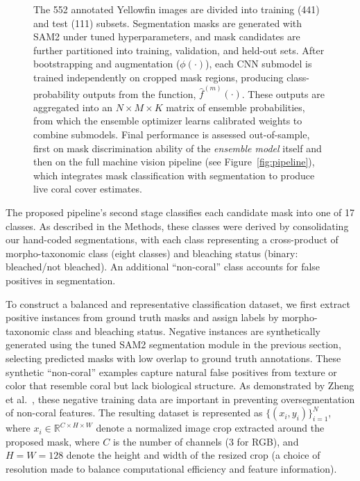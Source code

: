 \documentclass[11pt]{elsarticle}
\begin{document}
\begin{figure}
    \centering
    \resizebox{0.9\textheight}{!}{%
        
    }
    \caption{The 552 annotated Yellowfin images are divided into training (441) and test (111) subsets. Segmentation masks are generated with SAM2 under tuned hyperparameters, and mask candidates are further partitioned into training, validation, and held-out sets. After bootstrapping and augmentation ($\phi(\cdot)$), each CNN submodel is trained independently on cropped mask regions, producing class-probability outputs from the function, $\hat{f}^{(m)}(\cdot)$. These outputs are aggregated into an $N \times M \times K$ matrix of ensemble probabilities, from which the ensemble optimizer learns calibrated weights to combine submodels. Final performance is assessed out-of-sample, first on mask discrimination ability of the \emph{ensemble model} itself and then on the full machine vision pipeline (see Figure~\ref{fig:pipeline}), which integrates mask classification with segmentation to produce live coral cover estimates.}
    \label{fig:training_pipeline}
\end{figure}

The proposed pipeline's second stage classifies each candidate mask into one of 17 classes. As described in the Methods, these classes were derived by consolidating our hand-coded segmentations, with each class representing a cross-product of morpho-taxonomic class (eight classes) and bleaching status (binary: bleached/not bleached). An additional ``non-coral'' class accounts for false positives in segmentation.

To construct a balanced and representative classification dataset, we first extract positive instances from ground truth masks and assign labels by morpho-taxonomic class and bleaching status. Negative instances are synthetically generated using the tuned SAM2 segmentation module in the previous section, selecting predicted masks with low overlap to ground truth annotations. These synthetic ``non-coral'' examples capture natural false positives from texture or color that resemble coral but lack biological structure. As demonstrated by Zheng et al.\ \citep{zheng2024}, these negative training data are important in preventing oversegmentation of non-coral features. The resulting dataset is represented as $\{(x_i, y_i)\}_{i=1}^N$, where $x_i \in \mathbb{R}^{C \times H \times W}$ denote a normalized image crop extracted around the proposed mask, where $C$ is the number of channels ($3$ for RGB), and $H = W = 128$ denote the height and width of the resized crop (a choice of resolution made to balance computational efficiency and feature information).
\end{document}
